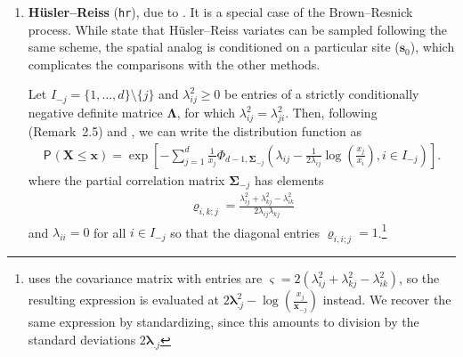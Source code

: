 \documentclass{article}
\newcommand{\bs}[1]{\boldsymbol {#1}}
\renewcommand{\P}[2][]{{\mathsf P}_{#1}\left(#2\right)}
\newcommand{\code}[1]{\texttt{#1}}
\newcommand{\pfrac}[2]{\left(\frac{#1}{#2}\right)}
\begin{document}
\begin{enumerate}
\item \textbf{H\"usler--Reiss} (\code{hr}), due to \cite{Husler:1989}. It is a special case of the Brown--Resnick process.
While \cite{Engelke:2015} state that H\"usler--Reiss variates can be sampled following the same scheme, the spatial analog is
conditioned on a particular site ($\bs{s}_0$), which complicates the comparisons with the other methods.

Let $I_{-j}=\{1, \ldots, d\} \setminus \{j\}$ and $\lambda_{ij}^2 \geq 0$ be entries of a strictly conditionally
negative definite matrice $\bs{\Lambda}$, for which $\lambda_{ij}^2=\lambda_{ji}^2$. Then, following \cite{Nikoloulopoulos:2009}
(Remark~2.5) and \cite{Huser:2013}, we can write the distribution function as
 \begin{align*}
   \P{\bs{X} \leq \bs{x}} = \exp \left[ -\sum_{j=1}^d \frac{1}{x_j} \Phi_{d-1, \bs{\Sigma}_{-j}} \left( \lambda_{ij}-
\frac{1}{2\lambda_{ij}}  \log\pfrac{x_j}{x_i}, i \in I_{-j}\right)\right].
                  \end{align*}
                  where the partial correlation matrix $\bs{\Sigma}_{-j}$ has elements
                  \begin{align*}
                     \varrho_{i,k; j}= \frac{\lambda_{ij}^2+\lambda_{kj}^2-\lambda_{ik}^2}{2\lambda_{ij}\lambda_{kj}}
                  \end{align*}
and $\lambda_{ii}=0$ for all $i \in I_{-j}$ so that the diagonal entries $\varrho_{i,i; j}=1$.\footnote{\cite{Engelke:2015}
uses the covariance matrix with entries are $\varsigma=2(\lambda_{ij}^2+\lambda_{kj}^2-\lambda_{ik}^2)$, so the resulting
expression is evaluated at $2\bs{\lambda}_{.j}^2-\log\pfrac{x_j}{\bs{x}_{-j}}$ instead. We recover the same expression by
standardizing, since this amounts to division by the standard deviations $2\bs{\lambda}_{.j}$}




\end{enumerate}
\end{document}
